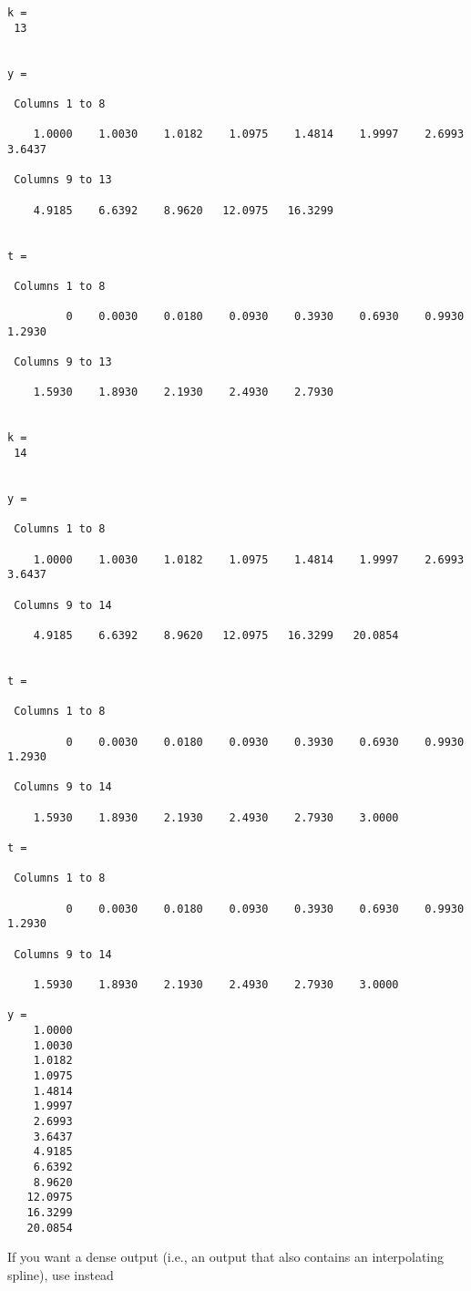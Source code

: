 \begin{verbatim}
k = 
 13 


y = 

 Columns 1 to 8

    1.0000    1.0030    1.0182    1.0975    1.4814    1.9997    2.6993    3.6437 

 Columns 9 to 13

    4.9185    6.6392    8.9620   12.0975   16.3299 


t = 

 Columns 1 to 8

         0    0.0030    0.0180    0.0930    0.3930    0.6930    0.9930    1.2930 

 Columns 9 to 13

    1.5930    1.8930    2.1930    2.4930    2.7930 


k = 
 14 


y = 

 Columns 1 to 8

    1.0000    1.0030    1.0182    1.0975    1.4814    1.9997    2.6993    3.6437 

 Columns 9 to 14

    4.9185    6.6392    8.9620   12.0975   16.3299   20.0854 


t = 

 Columns 1 to 8

         0    0.0030    0.0180    0.0930    0.3930    0.6930    0.9930    1.2930 

 Columns 9 to 14

    1.5930    1.8930    2.1930    2.4930    2.7930    3.0000 

t = 

 Columns 1 to 8

         0    0.0030    0.0180    0.0930    0.3930    0.6930    0.9930    1.2930 

 Columns 9 to 14

    1.5930    1.8930    2.1930    2.4930    2.7930    3.0000 

y = 
    1.0000 
    1.0030 
    1.0182 
    1.0975 
    1.4814 
    1.9997 
    2.6993 
    3.6437 
    4.9185 
    6.6392 
    8.9620 
   12.0975 
   16.3299 
   20.0854 
\end{verbatim}
 If you want a dense output (i.e., an output that also contains an interpolating
 spline), use instead
